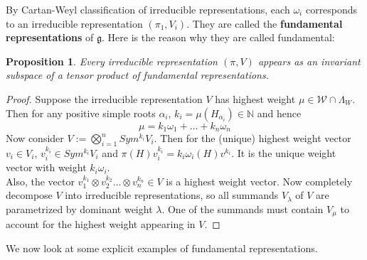 \documentclass[11pt]{article}
\newtheorem{proposition}[theorem]{Proposition}
\newcommand{\bb}[1]{\mathbb{#1}}
\newcommand{\mc}[1]{\mathcal{#1}}
\newcommand{\mf}[1]{\mathfrak{#1}}
\begin{document}
By Cartan-Weyl classification of irreducible representations, each $\omega_i$ corresponds to an irreducible representation $(\pi_1,V_i)$. They are called the \textbf{fundamental representations} of $\mf{g}$. Here is the reason why they are called fundamental:
\begin{proposition}
Every irreducible representation $(\pi,V)$ appears as an invariant subspace of a tensor product of fundamental representations.
\end{proposition}
\begin{proof}
Suppose the irreducible representation $V$ has highest weight $\mu \in \mc{W} \cap \Lambda_W$. Then for any positive simple roots $\alpha_i$, $k_i = \mu(H_{\alpha_i}) \in \bb{N}$ and hence
$$\mu = k_1\omega_1 + \dots + k_n \omega_n$$
Now consider $V := \bigotimes_{i=1}^{n} Sym^{k_i}V_i$. Then for the (unique) highest weight vector $v_i \in V_i$, $v_i^{k_i} \in Sym^{k_i}V_i$ and $\pi(H)v_i^{k_i} = k_i\omega_i(H)v^{k_i}$. It is the unique weight vector with weight $k_i\omega_i$.\\
Also, the vector $v_1^{k_1} \otimes v_2^{k_2} \dots \otimes v_n^{k_n} \in V$ is a highest weight vector. Now completely decompose $V$ into irreducible representations, so all summands $V_{\lambda}$ of $V$ are parametrized by dominant weight $\lambda$. One of the summands must contain $V_{\mu}$ to account for the highest weight appearing in $V$.
\end{proof}
We now look at some explicit examples of fundamental representations.
\end{document}
